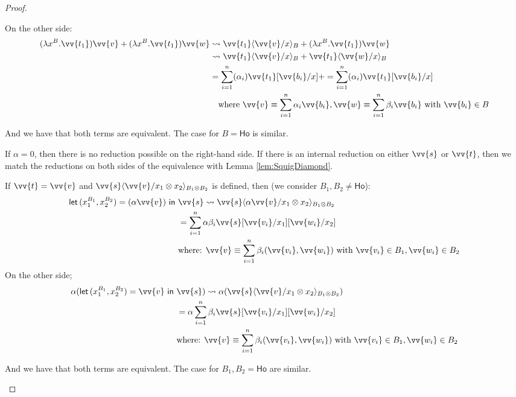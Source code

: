\documentclass[runningheads,orivec,envcountsame,envcountsect]{llncs}
\newcommand\ansubst[2]{\ensuremath{\langle #1 \rangle_{#2}}}
\newcommand\AbsBasis{\ensuremath{\mathsf{Ho}}}
\def\Pair#1#2{(#1,#2)} %
\def\Lam#1#2#3{\lambda#1^{#2}{.}#3} %
\def\letkeyword{\mathsf{let}}
\def\inkeyword{\mathsf{in}}
\def\LetP#1#2#3#4#5#6{\letkeyword\,\Pair{#1^{#2}}{#3^{#4}}=#5~\inkeyword~#6}
\def\lraneq{\rightsquigarrow}
\begin{document}
\begin{proof}
\begin{description}
    On the other side:
    \begin{align*}
      (\Lam{x}{B}{\vv{t_1}}) \vv{v} + (\Lam{x}{B}{\vv{t_1}}) \vv{w} &\lraneq \vv{t_1}\ansubst{\vv{v}/x}{B} + (\Lam{x}{B}{\vv{t_1}}) \vv{w}\\
      &\lraneq \vv{t_1}\ansubst{\vv{v}/x}{B} + \vv{t_1}\ansubst{\vv{w}/x}{B}\\
      &=\sum_{i=1}^{n}(\alpha_i)\vv{t_1}[\vv{b_i}/x] + =\sum_{i=1}^{n}(\alpha_i)\vv{t_1}[\vv{b_i}/x]\\
      &\quad\text{where }\vv{v}\equiv\sum_{i=1}^{n}\alpha_i\vv{b_i},\vv{w}\equiv\sum_{i=1}^{n}\beta_i\vv{b_i}\text{ with }\vv{b_i}\in B 
    \end{align*}

    And we have that both terms are equivalent. The case for $B=\AbsBasis$ is similar.

    \item[$\LetP{x_1}{B_1}{x_2}{B_2}{(\alpha \vv{t})}{\vv{s}}\equiv\alpha(\LetP{x_1}{A}{x_2}{B}{\vv{t}}{\vv{s}})$:] If $\alpha=0$, then there is no reduction possible on the right-hand side. If there is an internal reduction on either $\vv{s}$ or $\vv{t}$, then we match the reductions on both sides of the equivalence with Lemma \ref{lem:SquigDiamond}.
    
    If $\vv{t}=\vv{v}$ and $\vv{s}\ansubst{\vv{v}/x_1\otimes x_2}{B_1\otimes B_2}$ is defined, then (we consider $B_1,B_2\neq\AbsBasis$):
    \begin{align*}
    \LetP{x_1}{B_1}{x_2}{B_2}{(\alpha \vv{v})}{&\vv{s}}\lraneq \vv{s}\ansubst{\alpha\vv{v}/x_1\otimes x_2}{B_1\otimes B_2}\\
    &=\sum_{i=1}^{n}\alpha\beta_i \vv{s}[\vv{v_i}/x_1][\vv{w_i}/x_2]\\ 
    &\text{where: }\vv{v}\equiv\sum_{i=1}^n\beta_i\Pair{\vv{v_i}}{\vv{w_i}} \text{ with } \vv{v_i}\in B_1, \vv{w_i}\in B_2
    \end{align*}
    On the other side;
    \begin{align*}
    \alpha(\LetP{x_1}{B_1}{x_2}{B_2}{\vv{v}}{&\vv{s}})\lraneq \alpha(\vv{s}\ansubst{\vv{v}/x_1\otimes x_2}{B_1\otimes B_2})\\
    &=\alpha\sum_{i=1}^{n}\beta_i \vv{s}[\vv{v_i}/x_1][\vv{w_i}/x_2]\\ 
    &\text{where: } \vv{v}\equiv\sum_{i=1}^n\beta_i\Pair{\vv{v_i}}{\vv{w_i}} \text{ with } \vv{v_i}\in B_1, \vv{w_i}\in B_2
    \end{align*}

    And we have that both terms are equivalent. The case for $B_1,B_2=\AbsBasis$ are similar.


\end{description}
\end{proof}
\end{document}
